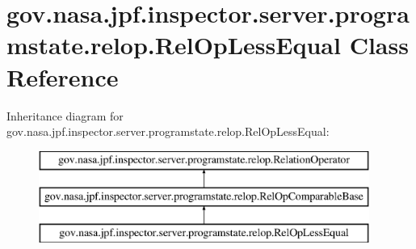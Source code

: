 \hypertarget{classgov_1_1nasa_1_1jpf_1_1inspector_1_1server_1_1programstate_1_1relop_1_1_rel_op_less_equal}{}\section{gov.\+nasa.\+jpf.\+inspector.\+server.\+programstate.\+relop.\+Rel\+Op\+Less\+Equal Class Reference}
\label{classgov_1_1nasa_1_1jpf_1_1inspector_1_1server_1_1programstate_1_1relop_1_1_rel_op_less_equal}
Inheritance diagram for gov.\+nasa.\+jpf.\+inspector.\+server.\+programstate.\+relop.\+Rel\+Op\+Less\+Equal\+:\begin{figure}[H]
\begin{center}
\leavevmode
\includegraphics[height=3.000000cm]{classgov_1_1nasa_1_1jpf_1_1inspector_1_1server_1_1programstate_1_1relop_1_1_rel_op_less_equal}
\end{center}
\end{figure}
